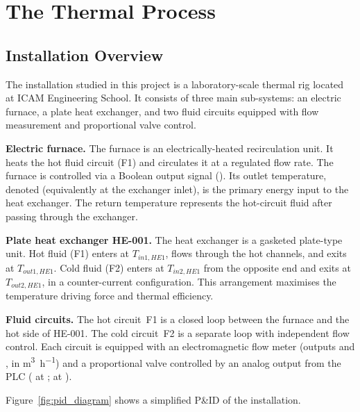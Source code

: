 \chapter{The Thermal Process}

\section{Installation Overview}

The installation studied in this project is a laboratory-scale thermal rig located at
ICAM Engineering School. It consists of three main sub-systems: an electric furnace,
a plate heat exchanger, and two fluid circuits equipped with flow measurement and
proportional valve control.

\textbf{Electric furnace.}
The furnace is an electrically-heated recirculation unit. It heats the hot fluid circuit
(F1) and circulates it at a regulated flow rate. The furnace is controlled via a Boolean
output signal (). Its outlet temperature, denoted
 (equivalently  at the exchanger inlet), is the primary
energy input to the heat exchanger. The return temperature  represents the
hot-circuit fluid after passing through the exchanger.

\textbf{Plate heat exchanger HE-001.}
The heat exchanger is a gasketed plate-type unit. Hot fluid (F1) enters at $T_{in1,HE1}$,
flows through the hot channels, and exits at $T_{out1,HE1}$. Cold fluid (F2) enters at
$T_{in2,HE1}$ from the opposite end and exits at $T_{out2,HE1}$, in a counter-current
configuration. This arrangement maximises the temperature driving force and thermal
efficiency.

\textbf{Fluid circuits.}
The hot circuit~F1 is a closed loop between the furnace and the hot side of HE-001.
The cold circuit~F2 is a separate loop with independent flow control.
Each circuit is equipped with an electromagnetic flow meter (outputs  and
, in \si{\metre\cubed\per\hour}) and a proportional valve controlled by an
analog output from the PLC ( at ;  at
).

Figure~\ref{fig:pid_diagram} shows a simplified P\&ID of the installation.

